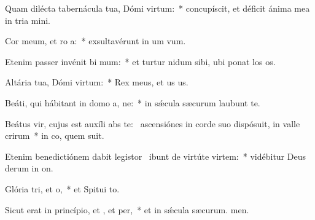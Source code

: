 \item Quam dilécta tabernácula tua, Dómi virtum:~* concupíscit, et déficit ánima mea in tria mini.
\item Cor meum, et ro a:~* exsultavérunt in um vum.
\item Etenim passer invénit bi mum:~* et turtur nidum sibi, ubi ponat los os.
\item Altária tua, Dómi virtum:~* Rex meus, et us us.
\item Beáti, qui hábitant in domo a, ne:~* in sǽcula sæcurum laubunt te.
\item Beátus vir, cujus est auxíli abs te:~\pscross{} ascensiónes in corde suo dispósuit, in valle crirum~* in co, quem suit.
\item Etenim benedictiónem dabit legistor~\pscross{} ibunt de virtúte  virtem:~* vidébitur Deus derum in on.
\item Glória tri, et o,~* et Spitui to.
\item Sicut erat in princípio, et , et per,~* et in sǽcula sæcurum. men.
